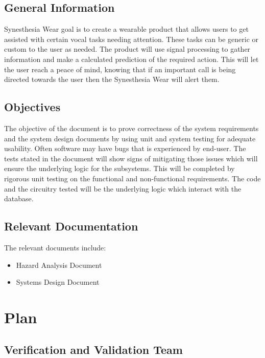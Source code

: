 \documentclass[12pt, titlepage]{article}
\begin{document}
\subsection{General Information}

Synesthesia Wear goal is to create a wearable product that allows users to get assisted with certain vocal tasks needing attention. These tasks can be generic or custom to the user as needed. The product will use signal processing to gather information and make a calculated prediction of the required action. This will let the user reach a peace of mind, knowing that if an important call is being directed towards the user then the Synesthesia Wear will alert them.

\subsection{Objectives}

The objective of the document is to prove correctness of the system requirements and the system design documents by using unit and system testing for adequate usability. Often software may have bugs that is experienced by end-user. The tests stated in the document will show signs of mitigating those issues which will ensure the underlying logic for the subsystems. This will be completed by rigorous unit testing on the functional and non-functional requirements. The code and the circuitry tested will be the underlying logic which interact with the database.

\subsection{Relevant Documentation}

The relevant documents include:
\begin{itemize}
\item Hazard Analysis Document
\item Systems Design Document

\end{itemize}


\section{Plan}


\subsection{Verification and Validation Team}
\end{document}
